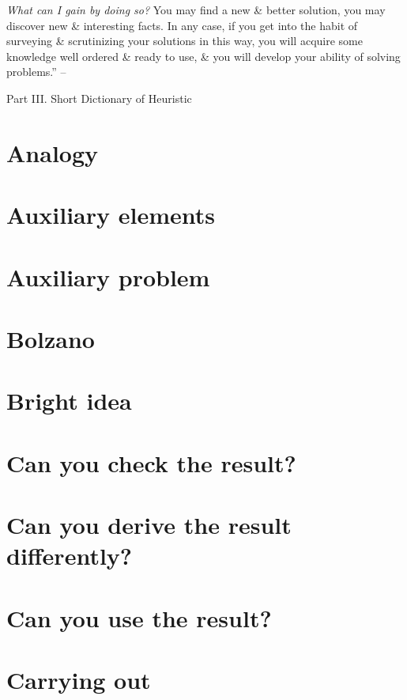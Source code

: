 \documentclass[oneside]{book}
\numberwithin{equation}{section}
\begin{document}
\textit{What can I gain by doing so?} You may find a new \& better solution, you may discover new \& interesting facts. In any case, if you get into the habit of surveying \& scrutinizing your solutions in this way, you will acquire some knowledge well ordered \& ready to use, \& you will develop your ability of solving problems.'' -- \cite[p. 35]{Polya2014}

\begin{center}
	\huge Part III. Short Dictionary of Heuristic
\end{center}

\section*{Analogy}

\section*{Auxiliary elements}

\section*{Auxiliary problem}

\section*{Bolzano}

\section*{Bright idea}

\section*{Can you check the result?}

\section*{Can you derive the result differently?}

\section*{Can you use the result?}

\section*{Carrying out}
\end{document}
